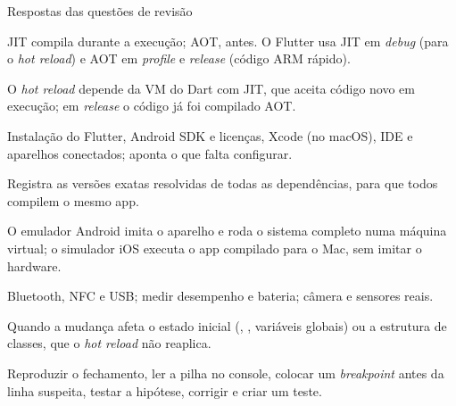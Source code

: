 \documentclass[aspectratio=169,10pt]{beamer}
\begin{document}
\begin{frame}{Respostas das questões de revisão}
  \begin{respostas}
    \item JIT compila durante a execução; AOT, antes. O Flutter usa JIT em \emph{debug} (para o \emph{hot reload}) e AOT em \emph{profile} e \emph{release} (código ARM rápido).
    \item O \emph{hot reload} depende da VM do Dart com JIT, que aceita código novo em execução; em \emph{release} o código já foi compilado AOT.
    \item Instalação do Flutter, Android SDK e licenças, Xcode (no macOS), IDE e aparelhos conectados; aponta o que falta configurar.
    \item Registra as versões exatas resolvidas de todas as dependências, para que todos compilem o mesmo app.
    \item O emulador Android imita o aparelho e roda o sistema completo numa máquina virtual; o simulador iOS executa o app compilado para o Mac, sem imitar o hardware.
    \item Bluetooth, NFC e USB; medir desempenho e bateria; câmera e sensores reais.
    \item Quando a mudança afeta o estado inicial (, , variáveis globais) ou a estrutura de classes, que o \emph{hot reload} não reaplica.
    \item Reproduzir o fechamento, ler a pilha no console, colocar um \emph{breakpoint} antes da linha suspeita, testar a hipótese, corrigir e criar um teste.
  \end{respostas}
\end{frame}

\end{document}
